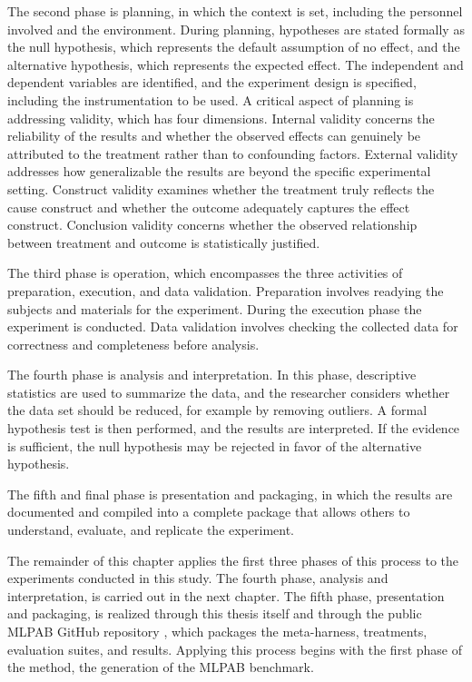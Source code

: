 \documentclass[
english,                 %
bibtex,                  %
]{kththesis}
\numberwithin{listing}{chapter}
\begin{document}
The second phase is planning, in which the context is set, including the personnel involved and the environment. During planning, hypotheses are stated formally as the null hypothesis, which represents the default assumption of no effect, and the alternative hypothesis, which represents the expected effect. The independent and dependent variables are identified, and the experiment design is specified, including the instrumentation to be used. A critical aspect of planning is addressing validity, which has four dimensions. Internal validity concerns the reliability of the results and whether the observed effects can genuinely be attributed to the treatment rather than to confounding factors. External validity addresses how generalizable the results are beyond the specific experimental setting. Construct validity examines whether the treatment truly reflects the cause construct and whether the outcome adequately captures the effect construct. Conclusion validity concerns whether the observed relationship between treatment and outcome is statistically justified.

The third phase is operation, which encompasses the three activities of preparation, execution, and data validation. Preparation involves readying the subjects and materials for the experiment. During the execution phase the experiment is conducted. Data validation involves checking the collected data for correctness and completeness before analysis.

The fourth phase is analysis and interpretation. In this phase, descriptive statistics are used to summarize the data, and the researcher considers whether the data set should be reduced, for example by removing outliers. A formal hypothesis test is then performed, and the results are interpreted. If the evidence is sufficient, the null hypothesis may be rejected in favor of the alternative hypothesis.

The fifth and final phase is presentation and packaging, in which the results are documented and compiled into a complete package that allows others to understand, evaluate, and replicate the experiment.

The remainder of this chapter applies the first three phases of this process to the experiments conducted in this study. The fourth phase, analysis and interpretation, is carried out in the next chapter. The fifth phase, presentation and packaging, is realized through this thesis itself and through the public \gls{MLPAB} GitHub repository \cite{wolff_wolffbemlpab_2026}, which packages the meta-harness, treatments, evaluation suites, and results. Applying this process begins with the first phase of the method, the generation of the \gls{MLPAB} benchmark.
\end{document}
